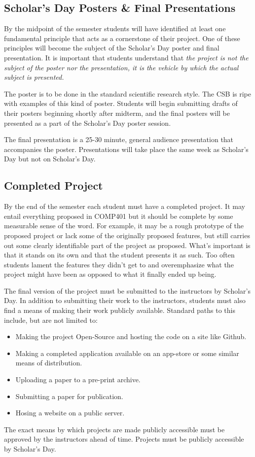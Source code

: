 \documentclass[10pt]{article}
\begin{document}
\subsection{Scholar's Day Posters \& Final Presentations}

By the midpoint of the semester students will have identified at least one fundamental principle that acts as a cornerstone of their project. One of these principles will become the subject of the Scholar's Day poster and final presentation. It is important that students understand that \textit{the project is not the subject of the poster nor the presentation, it is the vehicle by which the actual subject is presented.}

The poster is to be done in the standard scientific research style. The CSB is ripe with examples of this kind of poster. Students will begin submitting drafts of their posters beginning shortly after midterm, and the final posters will be presented as a part of the Scholar's Day poster session. 

The final presentation is a 25-30 minute, general audience presentation that accompanies the poster. Presentations will take place the same week as Scholar's Day but not on Scholar's Day.

\subsection{Completed Project}
 
By the end of the semester each student must have a completed project. It may entail everything proposed in COMP401 but it should be complete by some measurable sense of the word. For example, it may be a rough prototype of the proposed project or lack some of the originally proposed features, but still carries out some clearly identifiable part of the project as proposed. What's important is that it stands on its own and that the student presents it as such. Too often students lament the features they didn't get to and overemphasize what the project might have been as opposed to what it finally ended up being.   

The final version of the project must be submitted to the instructors by Scholar's Day. In addition to submitting their work to the instructors, students must also find a means of making their work publicly available. Standard paths to this include, but are not limited to:
\begin{itemize}
\item Making the project Open-Source and hosting the code on a site like Github.
\item Making a completed application available on an app-store or some similar means of distribution. 
\item Uploading a paper to a pre-print archive.
\item Submitting a paper for publication. 
\item Hosing a website on a public server. 
\end{itemize}
The exact means by which projects are made publicly accessible must be approved by the instructors ahead of time. Projects must be publicly accessible by Scholar's Day.
\end{document}
